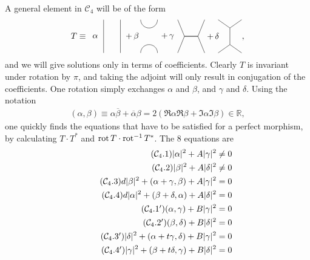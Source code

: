 \bigno
A general element in $\mathcal{C}_4$ will be of the form
\begin{align*}
T \equiv  \,
\begin{tikzpicture}[scale=0.7, baseline=-1mm]
	\begin{scope}
		\node (alpha) at (-0.5,0) {$\alpha$};
		\foreach \x in {0, 1} \draw (\x, -1) -- (\x, 1);
	\end{scope}
	\begin{scope}[shift={(2.2,0)}]
		\node (beta) at (-0.5,0) {$+\,\beta$};
		\draw (0,1) arc[start angle=180, end angle=360, radius=5mm];
		\draw (0,-1) arc[start angle=180, end angle=0, radius=5mm];
	\end{scope}\, 
	\begin{scope}[shift={(5.2,0)}]
		\node (gamma) at (-1.4,0) {$+\,\gamma$};
		\draw (-0.8,1) -- (-0.4, 0) -- (0.4,0) -- (0.8,1);
		\draw (-0.8,-1) -- (-0.4, 0) -- (0.4,0) -- (0.8,-1);
	\end{scope}
	\begin{scope}[shift={(7.5,0)}]
		\node (delta) at (-1,0) {$+\,\delta$};
		\draw (0.7, 1) -- (0, 0.5) -- (-0.7, 1);
		\draw (0.7, -1) -- (0, -0.5) -- (-0.7, -1);
		\draw (0, 0.5) -- (0, -0.5);
	\end{scope}
\end{tikzpicture}
,
\end{align*}
and we will give solutions only in terms of coefficients. Clearly $T$ is invariant under rotation by $\pi$, and taking the adjoint will only result in conjugation of the coefficients. One rotation simply exchanges $\alpha$ and $\beta$, and $\gamma$ and $\delta$. Using the notation
\begin{align*}
(\alpha, \beta) \equiv \alpha\overline{\beta} + \overline{\alpha}\beta = 2 \left( \Re{\alpha}\Re{\beta} + \Im{\alpha}\Im{\beta}\right) \in\mathbb{R},
\end{align*}
one quickly finds the equations that have to be satisfied for a perfect morphism, by calculating $T\cdot T^*$ and $\operatorname{rot} T \cdot \operatorname{rot}^{-1} T^*$. The 8 equations are
\begin{align*}
\tag{$\mathcal{C}_4.1$}\lvert \alpha \rvert^2 + A \lvert \gamma \rvert^2 & \neq 0 \\
\tag{$\mathcal{C}_4.2$}\lvert \beta \rvert^2 + A \lvert \delta \rvert^2 & \neq 0 \\
\tag{$\mathcal{C}_4.3$}d\lvert \beta \rvert^2 + (\alpha+\gamma, \beta)+ A \lvert \gamma \rvert^2 & = 0 \\
\tag{$\mathcal{C}_4.4$}d\lvert \alpha \rvert^2 + (\beta+\delta, \alpha)+ A \lvert \delta \rvert^2 & = 0\\
\tag{$\mathcal{C}_4.1^\prime$}(\alpha,\gamma) + B\lvert \gamma \rvert^2 & = 0 \\
\tag{$\mathcal{C}_4.2^\prime$}(\beta,\delta) + B\lvert \delta \rvert^2 & = 0 \\
\tag{$\mathcal{C}_4.3^\prime$}\lvert \delta \rvert^2 + (\alpha+t \gamma, \delta) + B\lvert \gamma \rvert^2 & = 0 \\
\tag{$\mathcal{C}_4.4^\prime$}\lvert \gamma \rvert^2 + (\beta+t \delta, \gamma) + B\lvert \delta \rvert^2 & = 0 
\end{align*}
